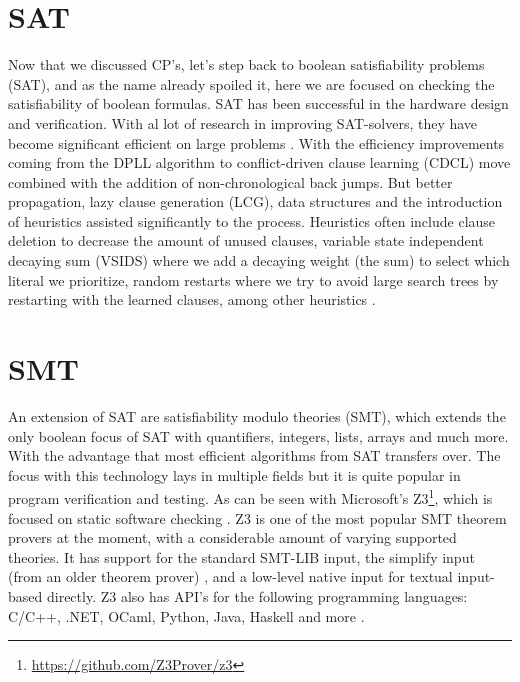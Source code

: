 \section{SAT}
\label{CS:SAT}
Now that we discussed CP's, let's step back to boolean satisfiability problems (SAT), and as the name already spoiled it, here we are focused on checking the satisfiability of boolean formulas. SAT has been successful in the hardware design and verification. With al lot of research in improving SAT-solvers, they have become significant efficient on large problems \cite{56bardin2019bringing}.
With the efficiency improvements coming from the DPLL algorithm to conflict-driven clause learning (CDCL) move combined with the addition of non-chronological back jumps. But better propagation, lazy clause generation (LCG), data structures and the introduction of heuristics assisted significantly to the process. Heuristics often include clause deletion to decrease the amount of unused clauses, variable state independent decaying sum (VSIDS) where we add a decaying weight (the sum) to select which literal we prioritize, random restarts where we try to avoid large search trees by restarting with the learned clauses, among other heuristics \cite{61MCSMarcDenecker, 60katebi2011empirical, 67stuckey2010lazyClauseGeneration}.



\section{SMT}
\label{CS:SMT}
An extension of SAT are satisfiability modulo theories (SMT), which extends the only boolean focus of SAT with quantifiers, integers, lists, arrays and much more. With the advantage that most efficient algorithms from SAT transfers over. The focus with this technology lays in multiple fields but it is quite popular in program verification and testing. As can be seen with Microsoft's Z3\footnote{\url{https://github.com/Z3Prover/z3}}, which is focused on static software checking \cite{54moura2008z3}. Z3 is one of the most popular SMT theorem provers at the moment, with a considerable amount of varying supported theories. It has support for the standard SMT-LIB input, the simplify input (from an older theorem prover) \cite{73detlefs2005simplify}, and a low-level native input for textual input-based directly. Z3 also has API's for the following programming languages: C/C++, .NET, OCaml, Python, Java, Haskell and more \cite{64WikiSMT}.


